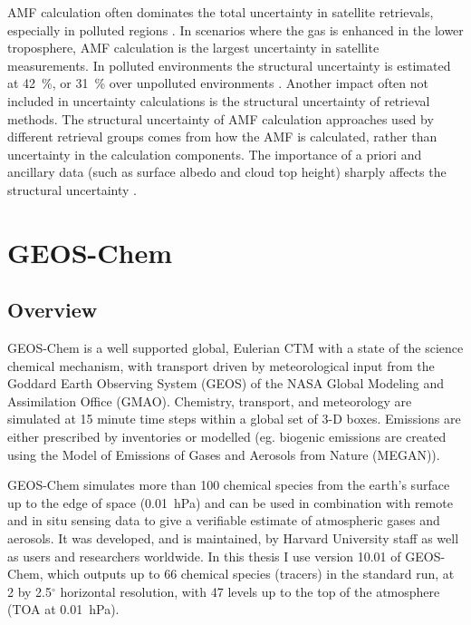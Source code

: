    AMF calculation often dominates the total uncertainty in satellite retrievals, especially in polluted regions \parencite{Lorente2017}.
    In scenarios where the gas is enhanced in the lower troposphere, AMF calculation is the largest uncertainty in satellite measurements.
    In polluted environments the structural uncertainty is estimated at 42~\%, or 31~\% over unpolluted environments \parencite{Lorente2017}.
    Another impact often not included in uncertainty calculations is the structural uncertainty of retrieval methods.
    The structural uncertainty of AMF calculation approaches used by different retrieval groups comes from how the AMF is calculated, rather than uncertainty in the calculation components.
    The importance of a priori and ancillary data (such as surface albedo and cloud top height) sharply affects the structural uncertainty \parencite{Lorente2017}.
    
\section{GEOS-Chem}
  \label{Model:GC}

  \subsection{Overview}
    GEOS-Chem is a well supported global, Eulerian CTM with a state of the science chemical mechanism, with transport driven by meteorological input from the Goddard Earth Observing System (GEOS) of the NASA Global Modeling and Assimilation Office (GMAO).
    Chemistry, transport, and meteorology are simulated at 15 minute time steps within a global set of 3-D boxes.
    Emissions are either prescribed by inventories or modelled (eg. biogenic emissions are created using the Model of Emissions of Gases and Aerosols from Nature (MEGAN)).
    
    GEOS-Chem simulates more than 100 chemical species from the earth's surface up to the edge of space (0.01~hPa) and can be used in combination with remote and in situ sensing data to give a verifiable estimate of atmospheric gases and aerosols.
    It was developed, and is maintained, by Harvard University staff as well as users and researchers worldwide.
    In this thesis I use version 10.01 of GEOS-Chem, which outputs up to 66 chemical species (tracers) in the standard run, at 2 by 2.5$^{\circ}$ horizontal resolution, with 47 levels up to the top of the atmosphere (TOA at 0.01~hPa). 
    
